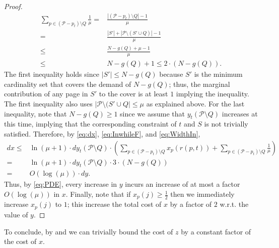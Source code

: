 \documentclass[11pt]{article}
\newcommand{\cP}{{\mathcal{P}}}
\begin{document}
\begin{proof}
\begin{equation}
\begin{aligned}
    	\label{eq:WidthIn}
		\sum_{p \in \left(\cP-p_t \right) \setminus Q} \frac{1}{\mu} ={} & \frac{ \left| \left(\cP-p_t \right) \setminus Q \right|-1}{\mu} 
  \\={} &
  \frac{|S'|+\left|\cP \setminus (S' \cup Q)\right|-1}{\mu} 
  \\\leq{} &
  \frac{N-g(Q)+\mu-1}{\mu} 
  \\\leq{} &
  N-g(Q)+1\leq 2 \cdot \left(N-g(Q)\right). 
  \end{aligned}
\end{equation} 
The first inequality holds since $|S'| \leq N-g(Q)$ because $S'$ is the minimum cardinality set that covers the demand of $N-g(Q)$; thus, the marginal contribution of any page in $S'$ to the cover is at least $1$ implying the inequality. The first inequality also uses $|\cP \setminus (S' \cup Q| \leq \mu$ as explained above.
For the last inequality, note that $N-g(Q) \geq 1$ since we assume that $y_t(\cP \setminus Q)$ increases at this time, implying that the corresponding constraint of $t$ and $S$ is not trivially satisfied. Therefore, by \eqref{eq:dx}, \eqref{eq:InwhileF}, and \eqref{eq:WidthIn},
\begin{equation}
	\label{eq:PDE}
	\begin{aligned}
	dx \leq{} &  \ln \left(\mu+1 \right) \cdot d y_t(\cP \setminus Q) \cdot \left(  	\sum_{p \in \left(\cP-p_t\right) \setminus Q} x_p(r(p,t)) + 	\sum_{p \in \left(\cP-p_t\right) \setminus Q} \frac{1}{\mu} \right) \\
	={} &  \ln \left(\mu+1 \right) \cdot d y_t(\cP \setminus Q) \cdot 3 \cdot \left( N-g(Q)\right)\\
	={} & O(\log (\mu)) \cdot dy.
	\end{aligned}
\end{equation} Thus, by \eqref{eq:PDE}, every increase in $y$ incurs an increase of at most a factor $O(\log (\mu))$ in $x$. Finally, note that if $x_p(j) \geq \frac{1}{2}$ then we immediately increase $x_p(j)$ to $1$; this increase the total cost of $x$ by a factor of $2$ w.r.t. the value of $y$. 
\end{proof}

To conclude, by  and  we can trivially bound the cost of $z$ by a constant factor of the cost of $x$.
\end{document}
